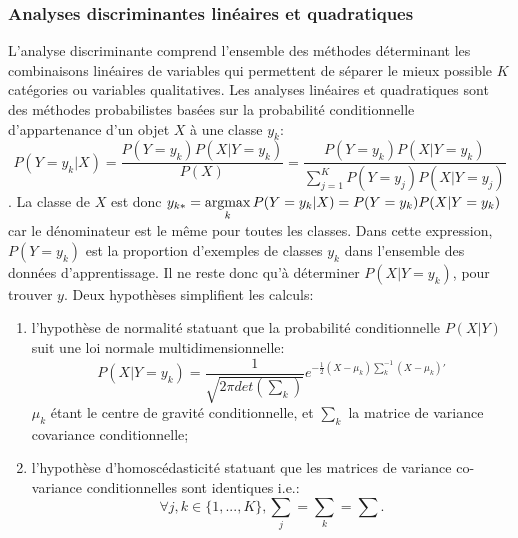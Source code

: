 %
%
%
%
 
\subsubsection{Analyses discriminantes linéaires et quadratiques}

L'analyse discriminante comprend l'ensemble des méthodes déterminant les combinaisons linéaires de variables qui permettent de séparer le mieux possible $K$ catégories ou variables qualitatives. Les analyses linéaires et quadratiques sont des méthodes probabilistes basées sur la probabilité conditionnelle d'appartenance d'un objet $X$ à une classe $y_k$: \[P(Y=y_k \vert X) = \frac{P(Y=y_k) P(X \vert Y=y_k)}{P(X)} = \frac{P(Y=y_k) P(X \vert Y=y_k)}{\sum\limits_{j = 1}^K P(Y=y_j) P(X \vert Y=y_j)}\].
La classe de $X$ est donc $y_{k*} = \mathop{\mathrm{argmax}}\limits_k P(Y=y_k \vert X) = P(Y=y_k) P(X \vert Y=y_k)$ car le dénominateur est le même pour toutes les classes. Dans cette expression, $P(Y=y_k)$ est la proportion d'exemples de classes $y_k$ dans l'ensemble des données d'apprentissage. Il ne reste donc qu'à déterminer $P(X \vert Y=y_k)$, pour trouver $y$. Deux hypothèses simplifient les calculs:
\begin{enumerate}
	\item l'hypothèse de normalité statuant que la probabilité conditionnelle $P(X \vert Y)$ suit une loi normale multidimensionnelle: \[P(X \vert Y = y_k) = \frac{1}{\sqrt{2\pi det(\sum_k)}}e^{-\frac{1}{2}(X - \mu_k)\sum_k^{-1}(X - \mu_k)'} \] $\mu_k$ étant le centre de gravité conditionnelle, et $\sum_k$ la matrice de variance covariance conditionnelle;
	\item l'hypothèse d'homoscédasticité statuant que les matrices de variance co-variance conditionnelles sont identiques i.e.: \[\forall j,k \in \lbrace 1,...,K \rbrace, \sum_j = \sum_k = \sum.\]
\end{enumerate}

